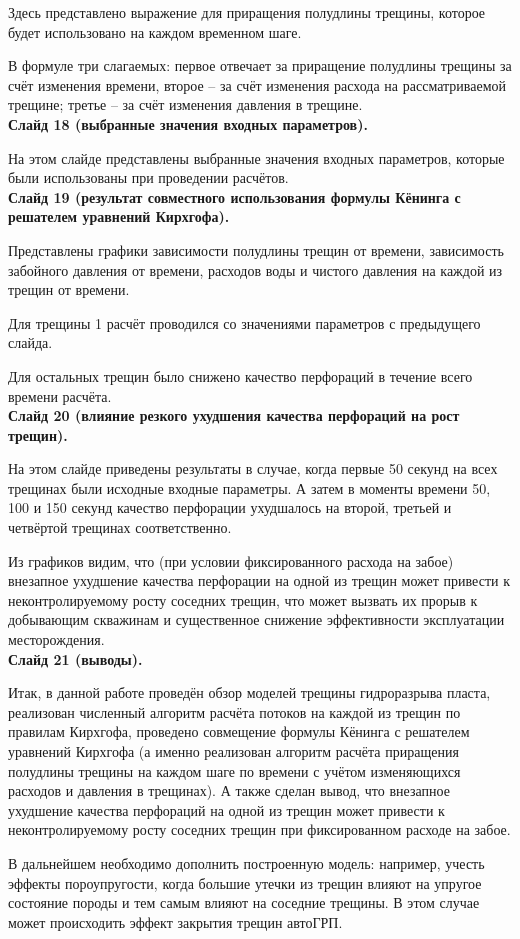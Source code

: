 \documentclass[a4paper, 12pt]{article}
\begin{document}
Здесь представлено выражение для приращения полудлины трещины, которое будет использовано на каждом временном шаге.

В формуле три слагаемых: первое отвечает за приращение полудлины трещины за счёт изменения времени, второе -- за счёт изменения расхода на рассматриваемой трещине; третье -- за счёт изменения давления в трещине.\\

\textbf{Слайд 18 (выбранные значения входных параметров).}

На этом слайде представлены выбранные значения входных параметров, которые были использованы при проведении расчётов.\\

\textbf{Слайд 19 (результат совместного использования формулы Кёнинга с решателем уравнений Кирхгофа).}

Представлены графики зависимости полудлины трещин от времени, зависимость забойного давления от времени, расходов воды и чистого давления на каждой из трещин от времени. 

Для трещины 1 расчёт проводился со значениями параметров с предыдущего слайда.

Для остальных трещин было снижено качество перфораций в течение всего времени расчёта.\\

\textbf{Слайд 20 (влияние резкого ухудшения качества перфораций на рост трещин).}

На этом слайде приведены результаты в случае, когда первые 50 секунд на всех трещинах были исходные входные параметры.
А затем в моменты времени 50, 100 и 150 секунд качество перфорации ухудшалось на второй, третьей и четвёртой трещинах соответственно.

Из графиков видим, что (при условии фиксированного расхода на забое) внезапное ухудшение качества перфорации на одной из трещин может привести к неконтролируемому росту соседних трещин, что может вызвать их прорыв к добывающим скважинам и существенное снижение эффективности эксплуатации месторождения.\\

\textbf{Слайд 21 (выводы).}

Итак, в данной работе проведён обзор моделей трещины гидроразрыва пласта, реализован численный алгоритм расчёта потоков на каждой из трещин по правилам Кирхгофа, проведено совмещение формулы Кёнинга с решателем уравнений Кирхгофа (а именно реализован алгоритм расчёта приращения полудлины трещины на каждом шаге по времени с учётом изменяющихся расходов и давления в трещинах).
А также сделан вывод, что внезапное ухудшение качества перфораций на одной из трещин может привести к неконтролируемому росту соседних трещин при фиксированном расходе на забое.

В дальнейшем необходимо дополнить построенную модель: например, учесть эффекты пороупругости, когда большие утечки из трещин влияют на упругое состояние породы и тем самым влияют на соседние трещины.
В этом случае может происходить эффект закрытия трещин автоГРП.
\end{document}

